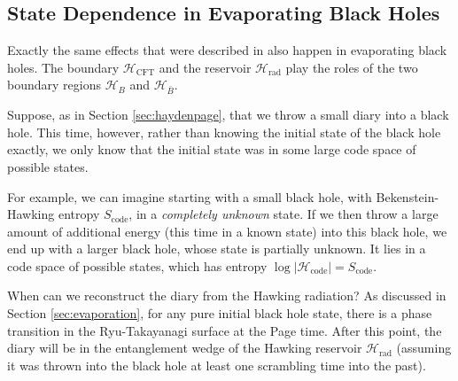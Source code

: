 \documentclass[11pt,a4paper]{article}
\begin{document}
\subsection{State Dependence in Evaporating Black Holes} \label{sec:statedepend}
Exactly the same effects that were described in \cite{hayden2018learning} also happen in evaporating black holes. The boundary $\mathcal{H}_\text{CFT}$ and the reservoir $\mathcal{H}_\text{rad}$ play the roles of the two boundary regions $\mathcal{H}_B$ and $\mathcal{H}_{\bar B}$. 

Suppose, as in Section \ref{sec:haydenpage}, that we throw a small diary into a black hole. This time, however, rather than knowing the initial state of the black hole exactly, we only know that the initial state was in some large code space of possible states. 

For example, we can imagine starting with a small black hole, with Bekenstein-Hawking entropy $S_\text{code}$, in a \emph{completely unknown} state. If we then throw a large amount of additional energy (this time in a known state) into this black hole, we end up with a larger black hole, whose state is partially unknown. It lies in a code space of possible states, which has entropy $\log |\mathcal{H}_\text{code}| = S_\text{code}$.

When can we reconstruct the diary from the Hawking radiation? As discussed in Section \ref{sec:evaporation}, for any pure initial black hole state, there is a phase transition in the Ryu-Takayanagi surface at the Page time. After this point, the diary will be in the entanglement wedge of the Hawking reservoir $\mathcal{H}_\text{rad}$ (assuming it was thrown into the black hole at least one scrambling time into the past).
\end{document}
